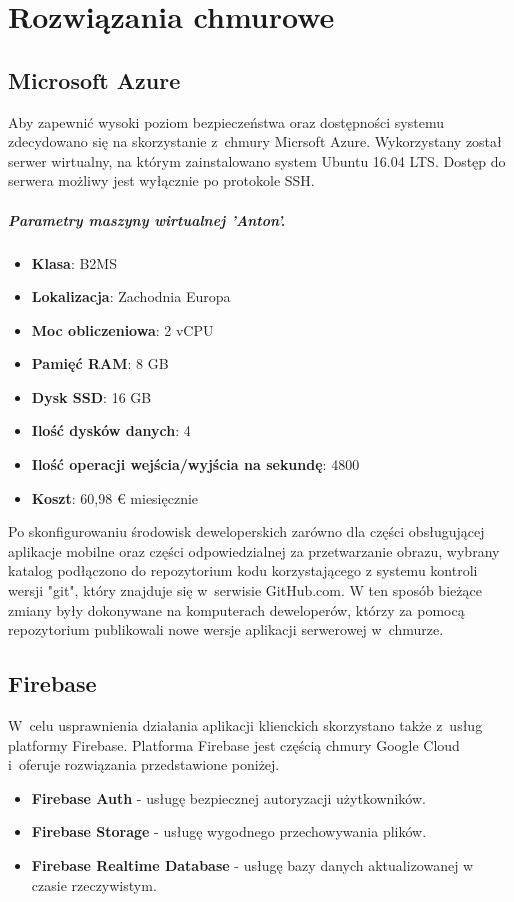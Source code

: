 \chapter{Rozwiązania chmurowe}

\section{Microsoft Azure}

Aby zapewnić wysoki poziom bezpieczeństwa oraz dostępności systemu zdecydowano się na skorzystanie z~chmury Micrsoft Azure.
Wykorzystany został serwer wirtualny, na którym zainstalowano system Ubuntu 16.04 LTS. Dostęp do serwera możliwy jest wyłącznie po protokole SSH.

\paragraph{Parametry maszyny wirtualnej 'Anton'.}
\begin{itemize}
    \item \textbf{Klasa}: B2MS
    \item \textbf{Lokalizacja}: Zachodnia Europa
    \item \textbf{Moc obliczeniowa}: 2 vCPU
    \item \textbf{Pamięć RAM}: 8 GB
    \item \textbf{Dysk SSD}: 16 GB
    \item \textbf{Ilość dysków danych}: 4
    \item \textbf{Ilość operacji wejścia/wyjścia na sekundę}: 4800
    \item \textbf{Koszt}: 60,98 € miesięcznie
\end{itemize}

Po skonfigurowaniu środowisk deweloperskich zarówno dla części obsługującej aplikacje mobilne oraz części odpowiedzialnej za przetwarzanie obrazu, wybrany katalog podłączono do repozytorium kodu korzystającego z systemu kontroli wersji "git", który znajduje się w~serwisie GitHub.com.
W ten sposób bieżące zmiany były dokonywane na komputerach deweloperów, którzy za pomocą repozytorium publikowali nowe wersje aplikacji serwerowej w~chmurze.

\section{Firebase}

W~celu usprawnienia działania aplikacji klienckich skorzystano także z~usług platformy Firebase. Platforma Firebase jest częścią chmury Google Cloud i~oferuje rozwiązania przedstawione poniżej.
\begin{itemize}
    \item \textbf{Firebase Auth} - usługę bezpiecznej autoryzacji użytkowników.
    \item \textbf{Firebase Storage} - usługę wygodnego przechowywania plików.
    \item \textbf{Firebase Realtime Database} - usługę bazy danych aktualizowanej w czasie rzeczywistym.
\end{itemize}

